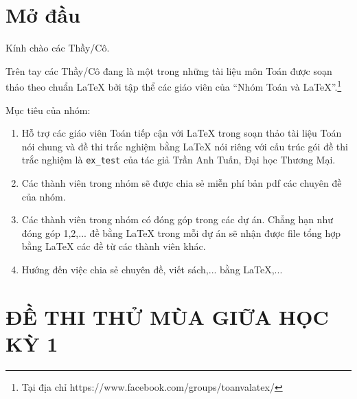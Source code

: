 \documentclass[12pt,a4paper,oneside]{book}
\renewcommand{\baselinestretch}{1.4}
\begin{document}
	

	
	
	
	\pagestyle{fancy}
	\lhead{\empty}
	\chead{\empty}
	\rhead{\empty}
	\lfoot{\empty}
	\tableofcontents
		\chapter*{Mở đầu}
	Kính chào các Thầy/Cô.
	
	\vspace{0.6cm}
	
	\noindent Trên tay các Thầy/Cô đang là một trong những tài liệu môn Toán được soạn thảo theo chuẩn \LaTeX{} bởi tập thể các giáo viên của ``Nhóm Toán và LaTeX''.\footnote{Tại địa chỉ https://www.facebook.com/groups/toanvalatex/}
	
	\vspace{0.6cm}
	
	\noindent Mục tiêu của nhóm: 
	\begin{enumerate}
		\item Hỗ trợ các giáo viên Toán tiếp cận với \LaTeX{} trong soạn thảo tài liệu Toán nói chung và đề thi trắc nghiệm bằng \LaTeX{} nói riêng với cấu trúc gói đề thi trắc nghiệm là \texttt{ex\_test} của tác giả Trần Anh Tuấn, Đại học Thương Mại.
		\item Các thành viên trong nhóm sẽ được chia sẻ miễn phí bản pdf  các chuyên đề của nhóm.
		\item Các thành viên trong nhóm có đóng góp trong các dự án. Chẳng hạn như đóng góp 1,2,... đề bằng \LaTeX{} trong mỗi dự án sẽ nhận được file tổng hợp bằng \LaTeX{} các đề từ các thành viên khác.
		\item Hướng đến việc chia sẻ chuyên đề, viết sách,... bằng \LaTeX,...
	\end{enumerate}

\chapter{ĐỀ THI THỬ MÙA GIỮA HỌC KỲ 1}

\newpage
\newpage
\newpage
\newpage
\newpage
\newpage
\newpage
\newpage
\newpage%
\newpage
\end{document}
